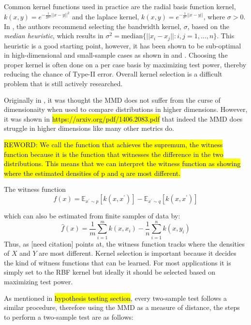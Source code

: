 Common kernel functions used in practice are the radial basis function kernel, $k(x, y)= e^{-\frac{1}{2\sigma^2}||x-y||^2}$ and the laplace kernel, $k(x, y)= e^{-\frac{1}{\sigma^2}||x-y||}$, where $\sigma > 0$. In \cite{gretton2005kernel}, the authors recommend selecting the bandwidth kernel, $\sigma$, based on the \textit{median heuristic}, which results in $\sigma^2=\text{median}\{||x_i-x_j||:i,j = 1,...,n\}$. This heuristic is a good starting point, however, it has been shown to be sub-optimal in high-dimensional and small-sample cases as shown in \cite{muandet2014kernel} and \cite{ramdas2015decreasing}. Choosing the proper kernel is often done on a per case basis by maximizing test power, thereby reducing the chance of Type-II error. Overall kernel selection is a difficult problem that is still actively researched.

Originally in \cite{gretton2012kernel}, it was thought the MMD does not suffer from the curse of dimensionaity when used to compare distributions in higher dimensions. However, it was shown in \hl{https://arxiv.org/pdf/1406.2083.pdf} that indeed the MMD does struggle in higher dimensions like many other metrics do.

\hl{REWORD: We call the function that achieves the supremum, the witness function because it is the function that witnesses the difference in the two distributions. This means that we can interpret the witness function as showing where the estimated densities of
p and q are most different.}

The witness function 
\begin{equation}
f(x)=\mathbb{E}_{x^{\prime} \sim p}\left[k\left(x, x^{\prime}\right)\right]-\mathbb{E}_{x^{\prime} \sim q}\left[k\left(x, x^{\prime}\right)\right]
\end{equation}

which can also be estimated from finite samples of data by:
\begin{equation}
\hat{f}(x)=\frac{1}{m} \sum_{i=1}^{m} k\left(x, x_{i}\right)-\frac{1}{n} \sum_{i=1}^{n} k\left(x, y_{i}\right)
\end{equation}
Thus, as [need citation] points at, the witness function tracks where the densities of $X$ and $Y$ are most different. 
Kernel selection is important because it decides the kind of witness functions that can be learned. For most applications it is simply set to the RBF kernel but ideally it should be selected based on maximizing test power.

As mentioned in \hl{hypothesis testing section}, every two-sample test follows a similar procedure, therefore using the MMD as a measure of distance, the steps to perform a two-sample test  are as follows:

